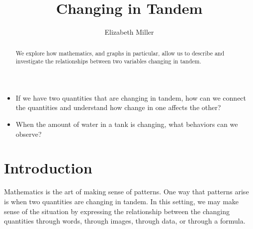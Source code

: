 \documentclass{ximera}
\author{Elizabeth Miller}
\title{Changing in Tandem}
\begin{document}
\begin{abstract}
  We explore how mathematics, and graphs in particular, allow us to describe and investigate the relationships between two variables changing in tandem.
\end{abstract}
\maketitle
\licenseAPC


\begin{motivatingQuestions}
  \begin{itemize}
\item If we have two quantities that are changing in tandem, how can
  we connect the quantities and understand how change in one affects
  the other?
\item When the amount of water in a tank is changing, what behaviors
  can we observe?
  \end{itemize}
\end{motivatingQuestions}


\section{Introduction}
Mathematics is the art of making sense of patterns.  One way that patterns arise is when two quantities are changing in tandem.  In this setting, we may make sense of the situation by expressing the relationship between the changing quantities through words, through images, through data, or through a formula.%
\end{document}
